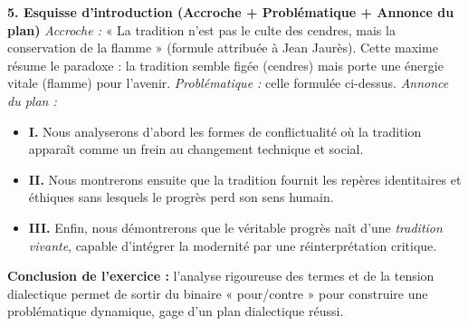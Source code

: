 \documentclass[11pt]{article}
\begin{document}
\begin{exoresolu}
\textbf{5. Esquisse d'introduction (Accroche + Problématique + Annonce du plan)}
\textit{Accroche :} « La tradition n'est pas le culte des cendres, mais la conservation de la flamme » (formule attribuée à Jean Jaurès). Cette maxime résume le paradoxe : la tradition semble figée (cendres) mais porte une énergie vitale (flamme) pour l'avenir.
\textit{Problématique :} celle formulée ci-dessus.
\textit{Annonce du plan :}
\begin{itemize}
    \item \textbf{I.} Nous analyserons d'abord les formes de conflictualité où la tradition apparaît comme un frein au changement technique et social.
    \item \textbf{II.} Nous montrerons ensuite que la tradition fournit les repères identitaires et éthiques sans lesquels le progrès perd son sens humain.
    \item \textbf{III.} Enfin, nous démontrerons que le véritable progrès naît d'une \emph{tradition vivante}, capable d'intégrer la modernité par une réinterprétation critique.
\end{itemize}

\textbf{Conclusion de l'exercice :} l'analyse rigoureuse des termes et de la tension dialectique permet de sortir du binaire « pour/contre » pour construire une problématique dynamique, gage d'un plan dialectique réussi.
\end{exoresolu}
\end{document}
